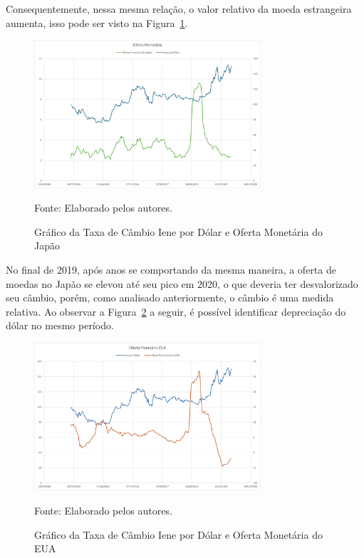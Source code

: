 \documentclass[a4paper,12pt]{article}[abntex2]
\begin{document}
Consequentemente, nessa mesma relação, o valor relativo da moeda estrangeira aumenta, isso pode ser visto na Figura~\ref{fig:cambioOfertaJapão}.

 \begin{figure}[H]
    \centering
    \caption{Gráfico da Taxa de Câmbio Iene por Dólar e Oferta Monetária do Japão} 
    \includegraphics[width=0.75\textwidth]{Oferta monetária Japão.png}
    \label{fig:cambioOfertaJapão}
    
    \footnotesize{Fonte: Elaborado pelos autores.}
    \end{figure}

No final de 2019, após anos se comportando da mesma maneira, a oferta de moedas no Japão se elevou até seu pico em 2020, o que deveria ter desvalorizado seu câmbio, porém, como analisado anteriormente, o câmbio é uma medida relativa.
Ao observar a Figura~\ref{fig:cambioOfertaEUA} a seguir, é possível identificar depreciação do dólar no mesmo período.

 \begin{figure}[H]
    \centering
    \caption{Gráfico da Taxa de Câmbio Iene por Dólar e Oferta Monetária do EUA} 
    \includegraphics[width=0.75\textwidth]{Oferta de Moeda EUA.png}
    \label{fig:cambioOfertaEUA}
    
    \footnotesize{Fonte: Elaborado pelos autores.}
    \end{figure}
\end{document}
